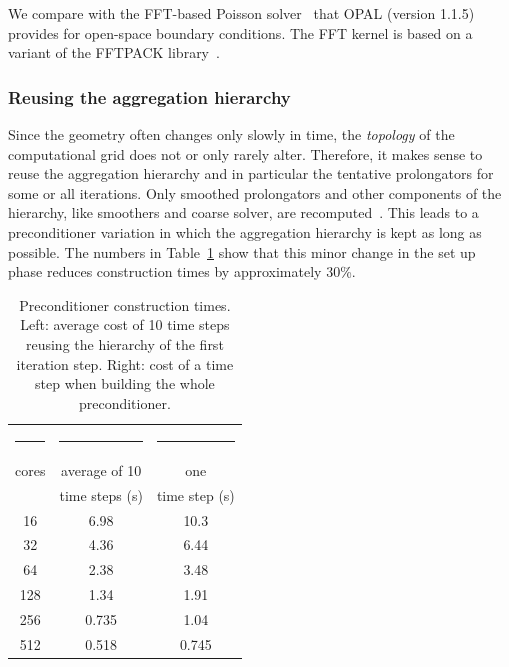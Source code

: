 \documentclass[a4paper,10pt,3p,preprint,pdftex]{elsarticle}
\begin{document}
We compare with the FFT-based Poisson solver~\cite{hoea:88} that
\textsc{OPAL} (version 1.1.5) provides for open-space boundary conditions.  
The FFT kernel is based  on a variant of the FFTPACK library~\cite{FFTPACK, Swar:82}.

\subsubsection*{Reusing the aggregation hierarchy}

Since the geometry often changes only slowly in time, the
\emph{topology} of the computational grid does not or only rarely alter.
Therefore, it makes sense to reuse the aggregation hierarchy and in
particular the tentative prolongators for some or all iterations.  Only
smoothed prolongators and other components of the hierarchy, like
smoothers and coarse solver, are recomputed~\cite[p.16]{gsht:06}.
This leads to a preconditioner variation in which the aggregation
hierarchy is kept as long as possible.  The numbers in
Table~\ref{tbl:timings_reuse_hierarchy} show that this minor change in
the set up phase reduces construction times by approximately 30\%.

\begin{table}[ht]
  \begin{center}
    \begin{tabular}{ccc}
      \hline
      \rule{15mm}{0mm} & \rule{30mm}{0mm} & \rule{30mm}{0mm} \\[-4mm]
      cores & average of 10 & one \\
      &time steps (s) &  time step (s) \\
      \hline
      16  & 6.98 & 10.3 \\
      32  & 4.36 &  6.44 \\
      64  & 2.38 &  3.48 \\
      128 & 1.34 &  1.91 \\ 
      256 & 0.735 &  1.04 \\
      512 & 0.518 &  0.745 \\
      \hline
    \end{tabular}
    \caption{Preconditioner construction times.  Left: average cost of
      10 time steps reusing the hierarchy of the first iteration step.
      Right: cost of a time step when building the whole
      preconditioner.
    }
    \label{tbl:timings_reuse_hierarchy}
  \end{center}
\end{table}
\end{document}
